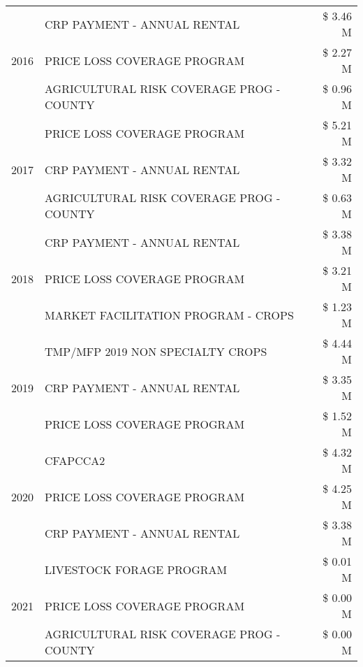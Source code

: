 \begin{tabular}{llr}
\cline{1-3}
\multirow[t]{3}{*}{2016} & CRP PAYMENT - ANNUAL RENTAL                   & \$ 3.46 M \\
 & PRICE LOSS COVERAGE PROGRAM                   & \$ 2.27 M \\
 & AGRICULTURAL RISK COVERAGE PROG - COUNTY      & \$ 0.96 M \\
\cline{1-3}
\multirow[t]{3}{*}{2017} & PRICE LOSS COVERAGE PROGRAM & \$ 5.21 M \\
 & CRP PAYMENT - ANNUAL RENTAL & \$ 3.32 M \\
 & AGRICULTURAL RISK COVERAGE PROG - COUNTY & \$ 0.63 M \\
\cline{1-3}
\multirow[t]{3}{*}{2018} & CRP PAYMENT - ANNUAL RENTAL & \$ 3.38 M \\
 & PRICE LOSS COVERAGE PROGRAM & \$ 3.21 M \\
 & MARKET FACILITATION PROGRAM - CROPS & \$ 1.23 M \\
\cline{1-3}
\multirow[t]{3}{*}{2019} & TMP/MFP 2019 NON SPECIALTY CROPS & \$ 4.44 M \\
 & CRP PAYMENT - ANNUAL RENTAL & \$ 3.35 M \\
 & PRICE LOSS COVERAGE PROGRAM & \$ 1.52 M \\
\cline{1-3}
\multirow[t]{3}{*}{2020} & CFAPCCA2 & \$ 4.32 M \\
 & PRICE LOSS COVERAGE PROGRAM & \$ 4.25 M \\
 & CRP PAYMENT - ANNUAL RENTAL & \$ 3.38 M \\
\cline{1-3}
\multirow[t]{3}{*}{2021} & LIVESTOCK FORAGE PROGRAM & \$ 0.01 M \\
 & PRICE LOSS COVERAGE PROGRAM & \$ 0.00 M \\
 & AGRICULTURAL RISK COVERAGE PROG - COUNTY & \$ 0.00 M \\
\cline{1-3}
\bottomrule
\end{tabular}
